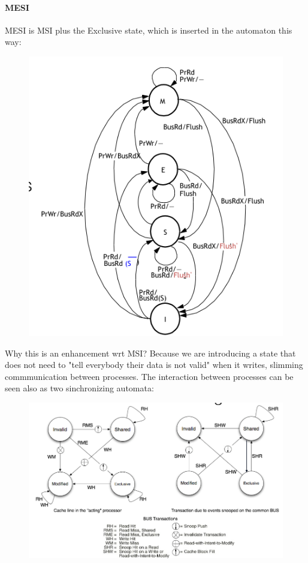 \documentclass[10pt,a4paper]{article}
\begin{document}
					\paragraph{MESI}
						MESI is MSI plus the Exclusive state, which is inserted in the automaton this way:
						\begin{figure}[H]
							\centering
							\includegraphics[width = \textwidth]{./images/MESI.png}
						\end{figure}
						Why this is an enhancement wrt MSI? Because we are introducing a state that does not need to "tell everybody their data is not valid" when it writes, slimming commmunication between processes. The interaction between processes can be seen also as two sinchronizing automata:
						\begin{figure}[H]
							\centering
							\includegraphics[width = \textwidth]{./images/MESIdual.png}
						\end{figure}
						
\end{document}
